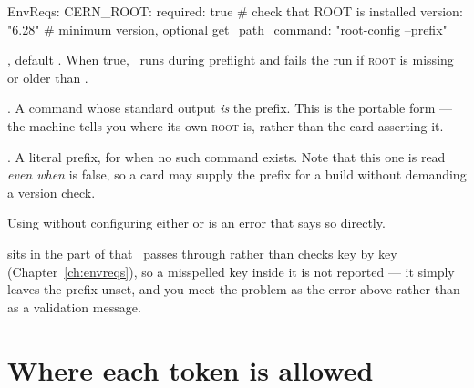 \begin{yamlwin}
EnvReqs:
  CERN_ROOT:
    required: true             # check that ROOT is installed
    version: "6.28"            # minimum version, optional
    get_path_command: "root-config --prefix"
\end{yamlwin}

\begin{keylist}
  \item[required] \opt, default . When true, \Jtwo\ runs
         during preflight and fails the run if \textsc{root}
        is missing or older than .
  \item[get\_path\_command] \opt. A command whose standard output \emph{is} the prefix.
        This is the portable form --- the machine tells you where its own \textsc{root}
        is, rather than the card asserting it.
  \item[path] \opt. A literal prefix, for when no such command exists. Note that this one
        is read \emph{even when}  is false, so a card may supply the
        prefix for a build without demanding a version check.
\end{keylist}

Using  without configuring either  or
 is an error that says so directly.

\begin{jwarn}
 sits in the part of  that \Jtwo\ passes through
rather than checks key by key (Chapter~\ref{ch:envreqs}), so a misspelled key inside it
is not reported --- it simply leaves the prefix unset, and you meet the problem as the
 error above rather than as a validation message.
\end{jwarn}

\section{Where each token is allowed}
\label{sec:token-scope}

